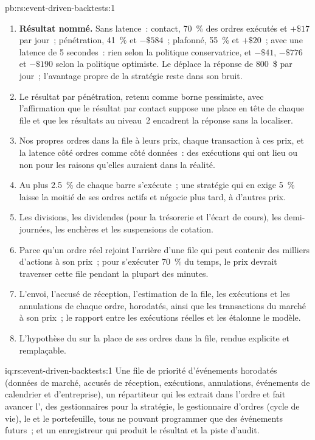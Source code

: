 \begin{solution}{pb:rs:event-driven-backtests:1}
\begin{enumerate}
\item \textbf{Résultat nommé.} Sans latence~: contact, 70~\% des ordres exécutés et $+\$17$ par jour~; pénétration, 41~\% et $-\$584$~; plafonné, 55~\% et $+\$20$~; avec une
latence de 5 secondes~: rien selon la politique conservatrice, et $-\$41$, $-\$776$ et $-\$190$ selon la politique optimiste. Le  déplace la réponse de 800~\$
par jour~; l'avantage propre de la stratégie reste dans son bruit.
\item Le résultat par pénétration, retenu comme borne pessimiste, avec l'affirmation que le résultat par contact suppose une place en tête de chaque file et que les résultats au
niveau~2 encadrent la réponse sans la localiser.
\item Nos propres ordres dans la file à leurs prix, chaque transaction à ces prix, et la latence côté ordres comme côté données~: des exécutions qui ont lieu ou non
pour les raisons qu'elles auraient dans la réalité.
\item Au plus 2.5~\% de chaque barre s'exécute~; une stratégie qui en exige 5~\% laisse la moitié de ses ordres actifs et négocie plus tard, à d'autres prix.
\item Les divisions, les dividendes (pour la trésorerie et l'écart de cours), les demi-journées, les enchères et les suspensions de cotation.
\item Parce qu'un ordre réel rejoint l'arrière d'une file qui peut contenir des milliers d'actions à son prix~; pour s'exécuter 70~\% du temps, le prix devrait
traverser cette file pendant la plupart des minutes.
\item L'envoi, l'accusé de réception, l'estimation de la file, les exécutions et les annulations de chaque ordre, horodatés, ainsi que les transactions du marché à son prix~; le rapport entre les
exécutions réelles et les  étalonne le modèle.
\item L'hypothèse du  sur la place de ses ordres dans la file, rendue explicite et remplaçable.
\end{enumerate}
\end{solution}

\begin{solution}{iq:rs:event-driven-backtests:1}
Une file de priorité d'événements horodatés (données de marché, accusés de réception, exécutions, annulations, événements de calendrier et d'entreprise), un répartiteur qui les
extrait dans l'ordre et fait avancer l', des gestionnaires pour la stratégie, le gestionnaire d'ordres (cycle de vie), le  et le portefeuille, tous ne
pouvant programmer que des événements futurs~; et un enregistreur qui produit le résultat et la piste d'audit.
\end{solution}

